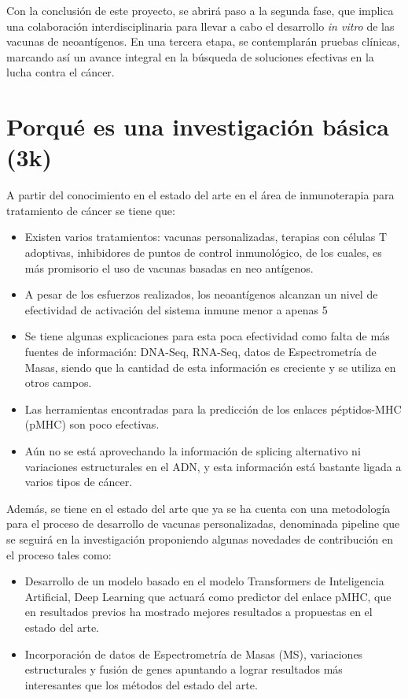 \documentclass[a4paper,11pt]{article}
\begin{document}
Con la conclusión de este proyecto, se abrirá paso a la segunda fase, que implica una colaboración interdisciplinaria para llevar a cabo el desarrollo \textit{in vitro} de las vacunas de neoantígenos. En una tercera etapa, se contemplarán pruebas clínicas, marcando así un avance integral en la búsqueda de soluciones efectivas en la lucha contra el cáncer.







\section{Porqué es una investigación básica (3k)}

A partir del conocimiento en el estado del arte en el área de inmunoterapia para tratamiento de cáncer se tiene que:

\begin{itemize}
	

\item Existen varios tratamientos: vacunas personalizadas, terapias con células T adoptivas, inhibidores de puntos de control inmunológico, de los cuales, es más promisorio el uso de vacunas basadas en neo antígenos.
\item A pesar de los esfuerzos realizados, los neoantígenos alcanzan un nivel de efectividad de activación del sistema inmune menor a apenas 5%
\item Se tiene algunas explicaciones para esta poca efectividad como falta de más fuentes de información: DNA-Seq, RNA-Seq, datos de Espectrometría de Masas, siendo que la cantidad de esta información es creciente y se utiliza en otros campos.
\item Las herramientas encontradas para la predicción de los enlaces péptidos-MHC (pMHC) son poco efectivas.
\item Aún no se está aprovechando la información de splicing alternativo ni variaciones estructurales en el ADN, y esta información está bastante ligada a varios tipos de cáncer.
\end{itemize}

Además, se tiene en el estado del arte que ya se ha cuenta con una metodología para el proceso de desarrollo de vacunas personalizadas, denominada pipeline que se seguirá en la investigación proponiendo algunas novedades de contribución en el proceso tales como:

\begin{itemize}


\item Desarrollo de un modelo basado en el modelo Transformers de Inteligencia Artificial, Deep Learning que actuará como predictor del enlace pMHC, que en resultados previos ha mostrado mejores resultados a propuestas en el estado del arte.
\item Incorporación de datos de Espectrometría de Masas (MS), variaciones estructurales y fusión de genes apuntando a lograr resultados más interesantes que los métodos del estado del arte.
\end{itemize}
\end{document}

